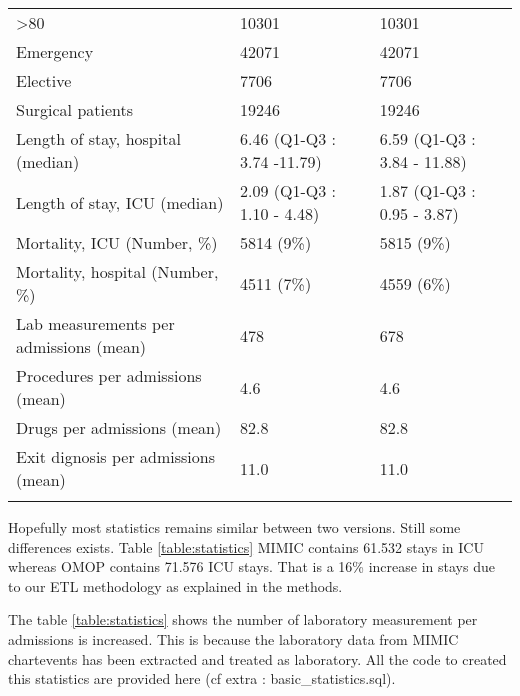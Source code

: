 \begin{table*}[t]
{\begin{tabular}{@{}lll@{}}
\textgreater{}80                       & 10301                       & 10301                              \\
Emergency                              & 42071                       & 42071                              \\
Elective                               & 7706                        & 7706                               \\
Surgical patients                      & 19246                       & 19246                              \\
Length of stay, hospital (median)      & 6.46 (Q1-Q3 : 3.74 -11.79)  & 6.59 (Q1-Q3 : 3.84 - 11.88)        \\
Length of stay, ICU (median)           & 2.09 (Q1-Q3 : 1.10 - 4.48)  & 1.87 (Q1-Q3 : 0.95 - 3.87)         \\
Mortality, ICU (Number, \%)            & 5814 (9\%)                  & 5815 (9\%)                         \\
Mortality, hospital (Number, \%)       & 4511 (7\%)                  & 4559 (6\%)                         \\
Lab measurements per admissions (mean) & 478                         & 678                                \\
Procedures per admissions (mean)       & 4.6                         & 4.6                                \\
Drugs per admissions (mean)            & 82.8                        & 82.8                               \\
Exit dignosis per admissions (mean)    & 11.0                        & 11.0                               \\\botrule
\end{tabular}}
\label{table:statistics}
\end{table*}

Hopefully most statistics remains similar between two versions. Still some
differences exists. Table \ref{table:statistics} MIMIC contains 61.532 stays in
ICU whereas OMOP contains 71.576 ICU stays. That is a 16\% increase in stays
due to our ETL methodology as explained in the methods.

The table \ref{table:statistics} shows the number of laboratory measurement per
admissions is increased. This is because the laboratory data from MIMIC
chartevents has been extracted and treated as laboratory. All the code to
created this statistics are provided here (cf extra : basic\_statistics.sql).


